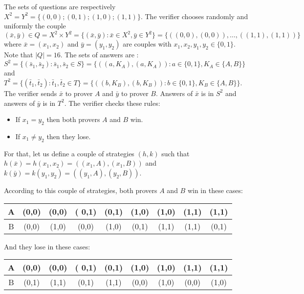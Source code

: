 The sets of questions are respectively $X^2=Y^2=\{(0,0);(0,1);(1,0);(1,1)\}.$ The verifier chooses randomly and uniformly the couple $(\bar{x}, \bar{y}) \in Q=X^2 \times Y^2=\{(\bar{x}, \bar{y}): \bar{x} \in X^2, \bar{y} \in Y^2 \}=\{((0,0),(0,0)), \ldots,  ((1,1),(1,1))\}$ where $\bar{x}=(x_1,x_2)$ and $ \bar{y}=(y_1,y_2)$ are couples with $x_1, x_2, y_1, y_2 \in \{0,1\}$. Note that $|Q|=16.$ The sets of answers are :$S^2=\{(\bar{s}_1, \bar{s}_2): \bar{s}_1, \bar{s}_2 \in S\}=   \{((a,K_A), (a,K_A)): a \in \{0,1\}, K_A \in \{A,B\} \}$ and $T^2=\{(\bar{t}_1, \bar{t}_2): \bar{t}_1, \bar{t}_2 \in T\}= \{((b,K_B), (b,K_B)): b \in \{0,1\}, K_B \in \{A,B\} \}$. The verifier sends $\bar{x}$ to prover $A$ and $\bar{y}$ to prover $B$. Answers of $\bar{x}$ is in $S^2$ and answers of $\bar{y}$ is in $T^2$. The verifier checks these rules:
\begin{itemize}
\item If $x_1=y_2$ then both provers $A$ and $B$ win.
\item If $x_1 \neq y_2$ then they lose.
\end{itemize}

For that, let us define a couple of strategies $(h,k)$ such that $h(\bar{x})=h(x_1,x_2)=((x_1,A),(x_1,B))$ and $k(\bar{y})=k(y_1,y_2)=((y_1,A),(y_2,B))$.

According to this couple of strategies, both provers $A$ and $B$ win in these cases:

\begin{table}[h]
\centering
\begin{tabular}{c|cccccccc} 
A & (0,0) & (0,0) &( 0,1) & (0,1) & (1,0) & (1,0) & (1,1) & (1,1) \\ 
\hline 
B & (0,0) & (1,0) & (0,0) & (1,0) & (0,1) & (1,1) & (1,1) & (0,1) 
\end{tabular} 
\end{table}

And they lose in these cases:

\begin{table}[h]
\centering
\begin{tabular}{c|cccccccc} 
A & (0,0) & (0,0) &( 0,1) & (0,1) & (1,0) & (1,0) & (1,1) & (1,1) \\ 
\hline 
B & (0,1) & (1,1) & (0,1) & (1,1) & (0,0) & (1,0) & (0,0) & (1,0) 
\end{tabular}
\end{table} 

